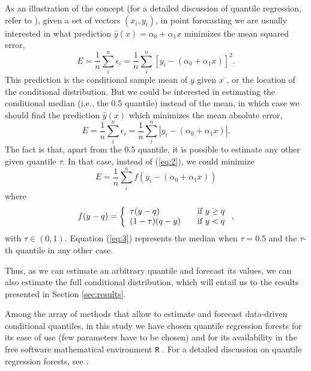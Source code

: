 \documentclass[a4paper,twocolumn,5p]{elsarticle}
\begin{document}
As an illustration of the concept (for a detailed discussion of
quantile regression, refer to \cite{koenker_quantile_2005}), given a
set of vectors $(x_i, y_i)$, in point forecasting we are usually
interested in what prediction $\hat y(x) = \alpha_0 + \alpha_1 x$
minimizes the mean squared error,
\begin{equation}
  \label{eq:1}
  E = \frac{1}{n} \sum^n_i \epsilon_i =
  \frac{1}{n} \sum^n_i [ y_i - (\alpha_0 + \alpha_1 x) ]^2.
\end{equation}
This prediction is the conditional sample mean of $y$ given $x$%
, or the location of the conditional distribution. But we could be
interested in estimating the conditional median (i.e., the 0.5
quantile) instead of the mean, in which case we should find the
prediction $\hat y(x)$ which minimizes the mean absolute error,
\begin{equation}
  \label{eq:2}
  E = \frac{1}{n} \sum^n_i \epsilon_i =
  \frac{1}{n} \sum^n_i | y_i - (\alpha_0 + \alpha_1 x) |.
\end{equation}
The fact is that, apart from the 0.5 quantile, it is possible to
estimate any other given quantile $\tau$. In that case, instead of
(\ref{eq:2}), we could minimize
\begin{equation}
  \label{eq:3}
E= \frac{1}{n} \sum^n_i f( y_i - (\alpha_0 + \alpha_1 x))
\end{equation}
where
\begin{equation}
  \label{eq:4}
  f(y-q) = \left\{ 
\begin{array}{l l}
\tau (y-q) & \quad \mbox{if $y \ge q$}\\
(1-\tau) (q-y) & \quad \mbox{if $y < q$}\\
\end{array} \right.,
\end{equation}
with $\tau \in (0,1)$. Equation (\ref{eq:3}) represents the
median when $\tau=0.5$ and the $\tau$-th quantile in any other case.

Thus, as we can estimate an arbitrary quantile and forecast its
values, we can also estimate the full conditional distribution, which
will entail us to the results presented in Section \ref{sec:results}.

Among the array of methods that allow to estimate and forecast
data-driven conditional quantiles, in this study we have chosen
quantile regression forests for its ease of use (few parameters have
to be chosen) and for its availability in the free software
mathematical environment \texttt{R} \cite{r-language}.
For a detailed discussion on quantile regression forests, see
\cite{meinshausen_quantile_2006}.
\end{document}
